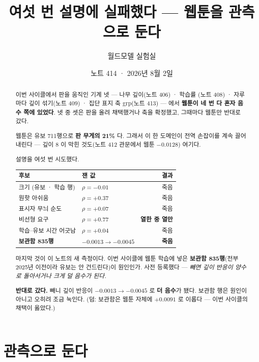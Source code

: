 \documentclass[11pt]{article}
\begin{document}
\title{여섯 번 설명에 실패했다 --- 웹툰을 관측으로 둔다}
\author{월드모델 실험실}
\date{노트 414 · 2026년 8월 2일}
\maketitle

\begin{abstract}
이번 사이클에서 판을 움직인 기계 넷 --- 나무 깊이(노트 406) · 학습률
(노트 408) · 자루마다 깊이 섞기(노트 409) · 집단 표지 축 grp(노트 413) ---
에서 \textbf{웹툰이 네 번 다 혼자 음수 쪽에 있었다}. 넷 중 셋은 판을 올려
채택했거나 축을 확정했고, 그때마다 웹툰만 반대로 갔다.

웹툰은 유보 711행으로 \textbf{판 무게의 21\%} 다. 그래서 이 한 도메인이
전역 손잡이를 계속 끌어내린다 --- 깊이 8 이 막힌 것도(노트 412 관문에서
웹툰 $-0.0128$) 여기다.

설명을 여섯 번 시도했다.

\begin{center}
\begin{tabular}{llr}
\hline
후보 & 잰 값 & 결과 \\
\hline
크기 (유보 · 학습 행) & $\rho = -0.01$ & 죽음 \\
원핫 아쉬움 & $\rho = +0.37$ & 죽음 \\
표시자 무늬 순도 & $\rho = +0.07$ & 죽음 \\
비선형 요구 & $\rho = +0.77$ & \textbf{열한 중 열만} \\
학습--유보 시간 어긋남 & $\rho = +0.04$ & 죽음 \\
\textbf{보관함 835행} & $-0.0013 \to -0.0045$ & \textbf{죽음} \\
\hline
\end{tabular}
\end{center}

마지막 것이 이 노트의 새 측정이다. 이번 사이클에 웹툰 학습에 넣은
\textbf{보관함 835행}(전부 2025년 이전이라 유보는 안 건드린다)이 원인인가.
사전 등록했다 --- \emph{빼면 깊이 반응이 양수로 돌아서거나 크게 덜 음수가
된다.}

\textbf{반대로 갔다.} 빼니 깊이 반응이 $-0.0013 \to \mathbf{-0.0045}$ 로
\textbf{더 음수}가 됐다. 보관함 행은 원인이 아니고 오히려 조금 눅인다.
(덤: 보관함은 웹툰 자체에 $+0.0091$ 로 이롭다 --- 이번 사이클의 채택이
옳았다.)
\end{abstract}

\section{관측으로 둔다}
\end{document}
